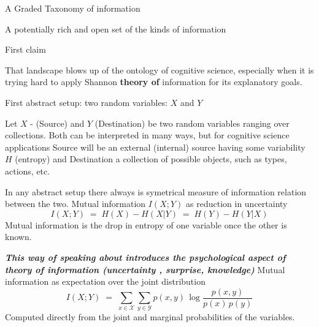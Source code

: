 \documentclass[10pt, aspectratio=169, handout]{beamer}
\begin{document}
\begin{frame} {A Graded Taxonomy of information }

A potentially rich and open set of the kinds of information \cite{fresco_functional_2018}

\end{frame}


\begin{frame} {First claim}
    \begin{center}
        \Large That landscape blows up of the ontology of cognitive science, especially when it is trying hard to apply Shannon \textbf{theory of} information for its explanatory goals.

    \end{center}
\end{frame}





\begin{frame}[label=abstract_setup] {First abstract setup: two random variables: \(X\) and \(Y\)}


Let \(X\) - (Source) and \(Y\) (Destination) be two random variables ranging over collections.
Both can be interpreted in many ways, but for cognitive science applications Source will be an external (internal) source having some variability $H$ (entropy) and Destination a collection of possible objects, such as types, actions, etc.

In any abstract setup there always is symetrical measure of information relation between the two.
Mutual information $I(X;Y)$ as reduction in uncertainty
\[
I(X;Y) \;=\; H(X) - H(X|Y) \;=\; H(Y) - H(Y|X)
\]
Mutual information is the drop in entropy of one variable once the other is known.

\emph{\textbf{This way of speaking about introduces the psychological aspect of theory of information (uncertainty , surprise, knowledge)
}}
Mutual information as expectation over the joint distribution
\[
I(X;Y) \;=\; \sum_{x \in \mathcal{X}} \sum_{y \in \mathcal{Y}} 
p(x,y)\, \log \frac{p(x,y)}{p(x)\,p(y)}
\]
Computed directly from the joint and marginal probabilities of the variables.


\end{frame}
\end{document}
